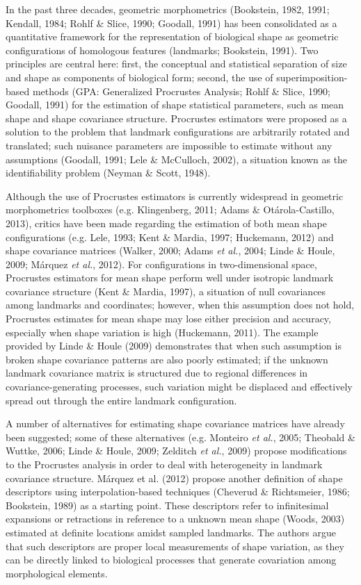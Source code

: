 \documentclass[12pt,twoside]{report}
\begin{document}
In the past three decades, geometric morphometrics (Bookstein, 1982,
1991; Kendall, 1984; Rohlf \& Slice, 1990; Goodall, 1991) has been
consolidated as a quantitative framework for the representation of
biological shape as geometric configurations of homologous features
(landmarks; Bookstein, 1991). Two principles are central here: first,
the conceptual and statistical separation of size and shape as
components of biological form; second, the use of superimposition-based
methods (GPA: Generalized Procrustes Analysis; Rohlf \& Slice, 1990;
Goodall, 1991) for the estimation of shape statistical parameters, such
as mean shape and shape covariance structure. Procrustes estimators were
proposed as a solution to the problem that landmark configurations are
arbitrarily rotated and translated; such nuisance parameters are
impossible to estimate without any assumptions (Goodall, 1991; Lele \&
McCulloch, 2002), a situation known as the identifiability problem
(Neyman \& Scott, 1948).

Although the use of Procrustes estimators is currently widespread in
geometric morphometrics toolboxes (e.g. Klingenberg, 2011; Adams \&
Otárola-Castillo, 2013), critics have been made regarding the estimation
of both mean shape configurations (e.g. Lele, 1993; Kent \& Mardia,
1997; Huckemann, 2012) and shape covariance matrices (Walker, 2000;
Adams \emph{et al.}, 2004; Linde \& Houle, 2009; Márquez \emph{et al.},
2012). For configurations in two-dimensional space, Procrustes
estimators for mean shape perform well under isotropic landmark
covariance structure (Kent \& Mardia, 1997), a situation of null
covariances among landmarks and coordinates; however, when this
assumption does not hold, Procrustes estimates for mean shape may lose
either precision and accuracy, especially when shape variation is high
(Huckemann, 2011). The example provided by Linde \& Houle (2009)
demonstrates that when such assumption is broken shape covariance
patterns are also poorly estimated; if the unknown landmark covariance
matrix is structured due to regional differences in
covariance-generating processes, such variation might be displaced and
effectively spread out through the entire landmark configuration.

A number of alternatives for estimating shape covariance matrices have
already been suggested; some of these alternatives (e.g. Monteiro
\emph{et al.}, 2005; Theobald \& Wuttke, 2006; Linde \& Houle, 2009;
Zelditch \emph{et al.}, 2009) propose modifications to the Procrustes
analysis in order to deal with heterogeneity in landmark covariance
structure. Márquez et al. (2012) propose another definition of shape
descriptors using interpolation-based techniques (Cheverud \&
Richtsmeier, 1986; Bookstein, 1989) as a starting point. These
descriptors refer to infinitesimal expansions or retractions in
reference to a unknown mean shape (Woods, 2003) estimated at definite
locations amidst sampled landmarks. The authors argue that such
descriptors are proper local measurements of shape variation, as they
can be directly linked to biological processes that generate covariation
among morphological elements.
\end{document}
